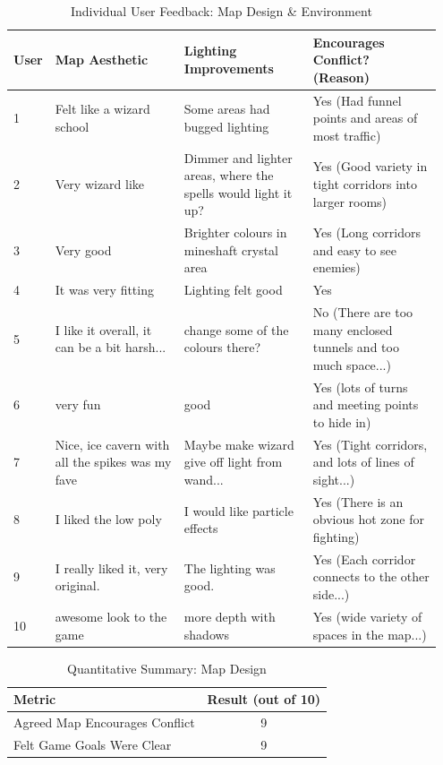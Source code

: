 \documentclass[12pt,a4paper]{report}
\begin{document}
\begin{table}[hp]
\centering
\caption{Individual User Feedback: Map Design \& Environment}
\label{tab:map1}
\begin{tabular}{p{0.05\linewidth} p{0.3\linewidth} p{0.3\linewidth} p{0.3\linewidth}}
\hline
\textbf{User} & \textbf{Map Aesthetic} & \textbf{Lighting Improvements} & \textbf{Encourages Conflict? (Reason)} \\
\hline
1 & Felt like a wizard school & Some areas had bugged lighting & Yes (Had funnel points and areas of most traffic) \\
2 & Very wizard like & Dimmer and lighter areas, where the spells would light it up? & Yes (Good variety in tight corridors into larger rooms) \\
3 & Very good & Brighter colours in mineshaft crystal area & Yes (Long corridors and easy to see enemies) \\
4 & It was very fitting & Lighting felt good & Yes \\
5 & I like it overall, it can be a bit harsh... & change some of the colours there? & No (There are too many enclosed tunnels and too much space...) \\
6 & very fun & good & Yes (lots of turns and meeting points to hide in) \\
7 & Nice, ice cavern with all the spikes was my fave & Maybe make wizard give off light from wand... & Yes (Tight corridors, and lots of lines of sight...) \\
8 & I liked the low poly & I would like particle effects & Yes (There is an obvious hot zone for fighting) \\
9 & I really liked it, very original. & The lighting was good. & Yes (Each corridor connects to the other side...) \\
10 & awesome look to the game & more depth with shadows & Yes (wide variety of spaces in the map...) \\
\hline
\end{tabular}
\end{table}

\begin{table}[hp]
\centering
\caption{Quantitative Summary: Map Design}
\label{tab:map2}
\begin{tabular}{l c}
\hline
\textbf{Metric} & \textbf{Result (out of 10)} \\
\hline
Agreed Map Encourages Conflict & 9 \\
Felt Game Goals Were Clear & 9 \\
\hline
\end{tabular}
\end{table}
\end{document}
